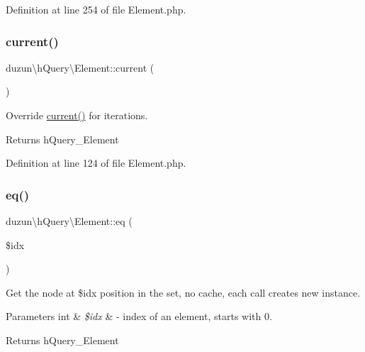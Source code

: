 Definition at line 254 of file Element.\+php.

\mbox{\label{classduzun_1_1hQuery_1_1Element_abef85d8c18394f2c2c1fc25a4f439b55}} 
\subsubsection{\texorpdfstring{current()}{current()}}
{\footnotesize\ttfamily duzun\textbackslash{}h\+Query\textbackslash{}\+Element\+::current (\begin{DoxyParamCaption}{ }\end{DoxyParamCaption})}

Override \mbox{\hyperlink{classduzun_1_1hQuery_1_1Element_abef85d8c18394f2c2c1fc25a4f439b55}{current()}} for iterations.

\begin{DoxyReturn}{Returns}
h\+Query\+\_\+\+Element 
\end{DoxyReturn}


Definition at line 124 of file Element.\+php.

\mbox{\label{classduzun_1_1hQuery_1_1Element_a2d857e83bcbd0d8de4c263b0afc64f43}} 
\subsubsection{\texorpdfstring{eq()}{eq()}}
{\footnotesize\ttfamily duzun\textbackslash{}h\+Query\textbackslash{}\+Element\+::eq (\begin{DoxyParamCaption}\item[{}]{\$idx }\end{DoxyParamCaption})}

Get the node at \$idx position in the set, no cache, each call creates new instance.


\begin{DoxyParams}[1]{Parameters}
int & {\em \$idx} & -\/ index of an element, starts with 0.\\
\hline
\end{DoxyParams}
\begin{DoxyReturn}{Returns}
h\+Query\+\_\+\+Element 
\end{DoxyReturn}


